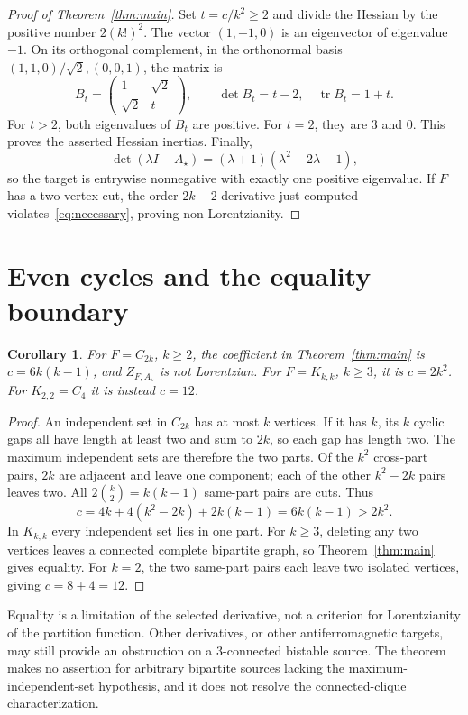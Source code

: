 \documentclass[11pt]{article}
\newtheorem{corollary}[theorem]{Corollary}
\begin{document}
\begin{proof}[Proof of Theorem~\ref{thm:main}]
Set $t=c/k^2\ge2$ and divide the Hessian by the positive number
$2(k!)^2$. The vector $(1,-1,0)$ is an eigenvector of eigenvalue $-1$.
On its orthogonal complement, in the orthonormal basis
$(1,1,0)/\sqrt2,(0,0,1)$, the matrix is
\[
 B_t=\begin{pmatrix}1&\sqrt2\\\sqrt2&t\end{pmatrix},
 \qquad \det B_t=t-2,\quad \operatorname{tr}B_t=1+t.
\]
For $t>2$, both eigenvalues of $B_t$ are positive. For $t=2$, they
are $3$ and $0$. This proves the asserted Hessian inertias. Finally,
\[
 \det(\lambda I-A_\star)=(\lambda+1)(\lambda^2-2\lambda-1),
\]
so the target is entrywise nonnegative with exactly one positive
eigenvalue. If $F$ has a two-vertex cut, the order-$2k-2$ derivative
just computed violates~\eqref{eq:necessary}, proving non-Lorentzianity.
\end{proof}

\section{Even cycles and the equality boundary}

\begin{corollary}\label{cor:examples}
For $F=C_{2k}$, $k\ge2$, the coefficient in Theorem~\ref{thm:main} is
$c=6k(k-1)$, and $Z_{F,A_\star}$ is not Lorentzian.
For $F=K_{k,k}$, $k\ge3$, it is $c=2k^2$.
For $K_{2,2}=C_4$ it is instead $c=12$.
\end{corollary}
\begin{proof}
An independent set in $C_{2k}$ has at most $k$ vertices. If it has
$k$, its $k$ cyclic gaps all have length at least two and sum to $2k$,
so each gap has length two. The maximum independent sets are therefore
the two parts. Of the $k^2$ cross-part pairs, $2k$ are adjacent and
leave one component; each of the other $k^2-2k$ pairs leaves two.
All $2\binom{k}{2}=k(k-1)$ same-part pairs are cuts. Thus
\[
 c=4k+4(k^2-2k)+2k(k-1)=6k(k-1)>2k^2.
\]
In $K_{k,k}$ every independent set lies in one part. For $k\ge3$,
deleting any two vertices leaves a connected complete bipartite graph,
so Theorem~\ref{thm:main} gives equality. For $k=2$, the two same-part
pairs each leave two isolated vertices, giving $c=8+4=12$.
\end{proof}

Equality is a limitation of the selected derivative, not a criterion for
Lorentzianity of the partition function. Other derivatives, or other
antiferromagnetic targets, may still provide an obstruction on a
3-connected bistable source. The theorem makes no assertion for arbitrary
bipartite sources lacking the maximum-independent-set hypothesis, and it
does not resolve the connected-clique characterization.
\end{document}
